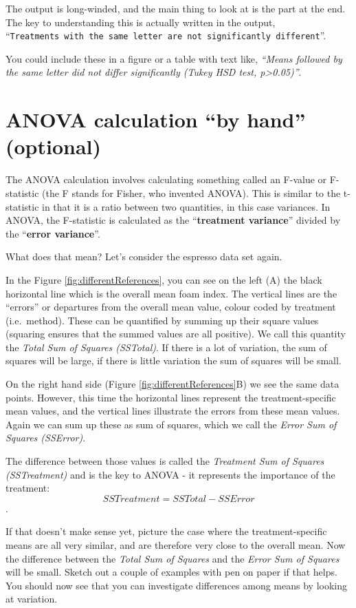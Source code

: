 \documentclass[
  a4paperpaper,
]{book}
\begin{document}
The output is long-winded, and the main thing to look at is the part at the end. The key to understanding this is actually written in the output, ``\texttt{Treatments\ with\ the\ same\ letter\ are\ not\ significantly\ different}''.

You could include these in a figure or a table with text like, \emph{``Means followed by the same letter did not differ significantly (Tukey HSD test, p\textgreater0.05)''}.

\hypertarget{anova-calculation-by-hand-optional}{%
\section{ANOVA calculation ``by hand'' (optional)}\label{anova-calculation-by-hand-optional}}

The ANOVA calculation involves calculating something called an F-value or F-statistic (the F stands for Fisher, who invented ANOVA). This is similar to the t-statistic in that it is a ratio between two quantities, in this case variances. In ANOVA, the F-statistic is calculated as the ``\textbf{treatment variance}'' divided by the ``\textbf{error variance}''.

What does that mean? Let's consider the espresso data set again.

In the Figure \ref{fig:differentReferences}, you can see on the left (A) the black horizontal line which is the overall mean foam index. The vertical lines are the ``errors'' or departures from the overall mean value, colour coded by treatment (i.e.~method). These can be quantified by summing up their square values (squaring ensures that the summed values are all positive). We call this quantity the \emph{Total Sum of Squares (SSTotal)}. If there is a lot of variation, the sum of squares will be large, if there is little variation the sum of squares will be small.

On the right hand side (Figure \ref{fig:differentReferences}B) we see the same data points. However, this time the horizontal lines represent the treatment-specific mean values, and the vertical lines illustrate the errors from these mean values. Again we can sum up these as sum of squares, which we call the \emph{Error Sum of Squares (SSError)}.

The difference between those values is called the \emph{Treatment Sum of Squares (SSTreatment)} and is the key to ANOVA - it represents the importance of the treatment: \[SSTreatment = SSTotal - SSError\].

If that doesn't make sense yet, picture the case where the treatment-specific means are all very similar, and are therefore very close to the overall mean. Now the difference between the \emph{Total Sum of Squares} and the \emph{Error Sum of Squares} will be small. Sketch out a couple of examples with pen on paper if that helps. You should now see that you can investigate differences among means by looking at variation.
\end{document}
